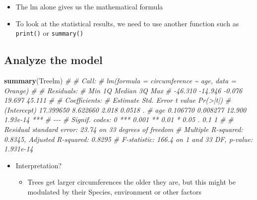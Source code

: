 \documentclass[
]{book}
\newenvironment{Shaded}{\begin{snugshade}}{\end{snugshade}}
\newcommand{\CommentTok}[1]{\textcolor[rgb]{0.56,0.35,0.01}{\textit{#1}}}
\newcommand{\FunctionTok}[1]{\textcolor[rgb]{0.13,0.29,0.53}{\textbf{#1}}}
\newcommand{\NormalTok}[1]{#1}
\providecommand{\tightlist}{%
  \setlength{\itemsep}{0pt}\setlength{\parskip}{0pt}}
\begin{document}
\begin{itemize}
\tightlist
\item
  The lm alone gives us the mathematical formula
\item
  To look at the statistical results, we need to use another function such as \texttt{print()} or \texttt{summary()}
\end{itemize}

\subsection{Analyze the model}\label{analyze-the-model}

\begin{Shaded}
\begin{Highlighting}[]
\FunctionTok{summary}\NormalTok{(Treelm)}
\CommentTok{\# }
\CommentTok{\# Call:}
\CommentTok{\# lm(formula = circumference \textasciitilde{} age, data = Orange)}
\CommentTok{\# }
\CommentTok{\# Residuals:}
\CommentTok{\#     Min      1Q  Median      3Q     Max }
\CommentTok{\# {-}46.310 {-}14.946  {-}0.076  19.697  45.111 }
\CommentTok{\# }
\CommentTok{\# Coefficients:}
\CommentTok{\#              Estimate Std. Error t value Pr(\textgreater{}|t|)    }
\CommentTok{\# (Intercept) 17.399650   8.622660   2.018   0.0518 .  }
\CommentTok{\# age          0.106770   0.008277  12.900 1.93e{-}14 ***}
\CommentTok{\# {-}{-}{-}}
\CommentTok{\# Signif. codes:  0 \textquotesingle{}***\textquotesingle{} 0.001 \textquotesingle{}**\textquotesingle{} 0.01 \textquotesingle{}*\textquotesingle{} 0.05 \textquotesingle{}.\textquotesingle{} 0.1 \textquotesingle{} \textquotesingle{} 1}
\CommentTok{\# }
\CommentTok{\# Residual standard error: 23.74 on 33 degrees of freedom}
\CommentTok{\# Multiple R{-}squared:  0.8345,  Adjusted R{-}squared:  0.8295 }
\CommentTok{\# F{-}statistic: 166.4 on 1 and 33 DF,  p{-}value: 1.931e{-}14}
\end{Highlighting}
\end{Shaded}

\begin{itemize}
\tightlist
\item
  Interpretation?

  \begin{itemize}
  \tightlist
  \item
    Trees get larger circumferences the older they are, but this might be modulated by their Species, environment or other factors
  \end{itemize}
\end{itemize}
\end{document}
